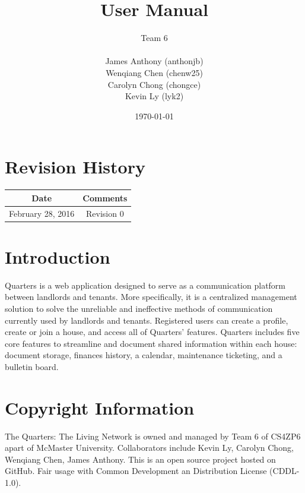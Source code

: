 \documentclass[12pt]{article}
\begin{document}
    \title{User Manual}
    \author{Team 6\\ \\James Anthony (anthonjb)\\ Wenqiang Chen (chenw25)\\ Carolyn Chong
        (chongce)\\ Kevin Ly (lyk2)}
    \date{\today}

    \maketitle

    \pagebreak

    \tableofcontents
    \listoffigures

    \section*{Revision History}
    \begin{tabular}{|c|c|}
        \hline
        \textbf{Date}  & \textbf{Comments} \\ \hline
        February 28, 2016 & Revision 0 \\ \hline
    \end{tabular}

    \pagebreak


    \section{Introduction}
	Quarters is a web application designed to serve as a communication platform between landlords and tenants. More specifically, it is a centralized management solution to solve the unreliable and ineffective methods of communication currently used by landlords and tenants. Registered users can create a profile, create or join a house, and access all of Quarters’ features. Quarters includes five core features to streamline and document shared information within each house: document storage, finances history, a calendar, maintenance ticketing, and a bulletin board.

    \section{Copyright Information}
    The Quarters: The Living Network is owned and managed by Team 6 of CS4ZP6 apart of McMaster University. Collaborators include Kevin Ly, Carolyn Chong, Wenqiang Chen, James Anthony. This is an open source project hosted on GitHub. Fair usage with Common Development an Distribution License (CDDL-1.0).
\end{document}
